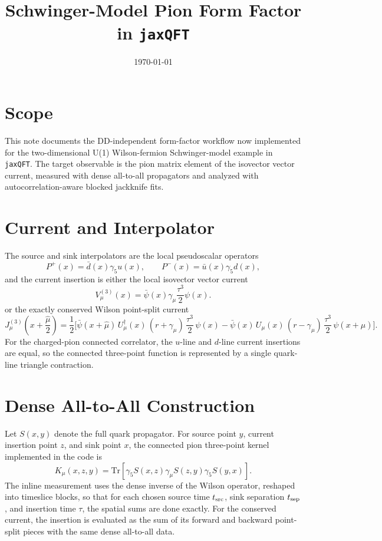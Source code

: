 \documentclass[11pt]{article}
\title{Schwinger-Model Pion Form Factor in \texttt{jaxQFT}}
\author{}
\date{\today}
\begin{document}
\maketitle

\section{Scope}
This note documents the DD-independent form-factor workflow now implemented for
the two-dimensional U(1) Wilson-fermion Schwinger-model example in
\texttt{jaxQFT}. The target observable is the pion matrix element of the
isovector vector current, measured with dense all-to-all propagators and
analyzed with autocorrelation-aware blocked jackknife fits.

\section{Current and Interpolator}
The source and sink interpolators are the local pseudoscalar operators
\begin{equation}
  P^+(x) = \bar d(x) \gamma_5 u(x),
  \qquad
  P^-(x) = \bar u(x) \gamma_5 d(x),
\end{equation}
and the current insertion is either the local isovector vector current
\begin{equation}
  V^{(3)}_\mu(x) = \bar\psi(x)\gamma_\mu \frac{\tau^3}{2}\psi(x).
\end{equation}
or the exactly conserved Wilson point-split current
\begin{equation}
  J^{(3)}_\mu\!\left(x+\frac{\hat\mu}{2}\right)
  =
  \frac{1}{2}\Big[
    \bar\psi(x+\hat\mu)\,U^\dagger_\mu(x)\,(r+\gamma_\mu)\,\frac{\tau^3}{2}\,\psi(x)
    -
    \bar\psi(x)\,U_\mu(x)\,(r-\gamma_\mu)\,\frac{\tau^3}{2}\,\psi(x+\hat\mu)
  \Big].
\end{equation}
For the charged-pion connected correlator, the $u$-line and $d$-line current
insertions are equal, so the connected three-point function is represented by a
single quark-line triangle contraction.

\section{Dense All-to-All Construction}
Let $S(x,y)$ denote the full quark propagator. For source point $y$, current
insertion point $z$, and sink point $x$, the connected pion three-point kernel
implemented in the code is
\begin{equation}
  K_\mu(x,z,y)
  =
  \mathrm{Tr}\left[
    \gamma_5 S(x,z) \gamma_\mu S(z,y) \gamma_5 S(y,x)
  \right].
\end{equation}
The inline measurement uses the dense inverse of the Wilson operator, reshaped
into timeslice blocks, so that for each chosen source time $t_{\rm src}$, sink
separation $t_{\rm sep}$, and insertion time $\tau$, the spatial sums are done
exactly. For the conserved current, the insertion is evaluated as the sum of
its forward and backward point-split pieces with the same dense all-to-all data.
\end{document}
